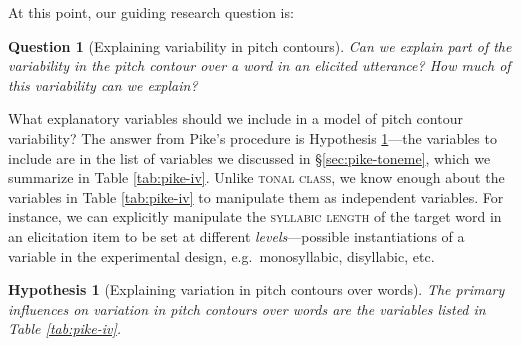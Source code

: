 \documentclass[12pt]{article}
\newtheorem{hypothesis}{Hypothesis}
\newtheorem{question}{Question}
\begin{document}
At this point, our guiding research question is:

\begin{question}[Explaining variability in pitch contours]
Can we explain part of the variability in the pitch contour over a word in an
elicited utterance? How much of this variability can we explain?
\end{question}

What explanatory variables should we include in a model of pitch
contour variability? The answer from Pike's procedure is Hypothesis
\ref{hypothesis:variance}---the variables to include are in the list of
variables we discussed in \S\ref{sec:pike-toneme}, which we summarize
in Table \ref{tab:pike-iv}. Unlike \textsc{tonal class}, we know
enough about the variables in Table \ref{tab:pike-iv} to manipulate
them as independent variables. For instance, we can explicitly
manipulate the \textsc{syllabic length} of the target word in an
elicitation item to be set at different \textit{levels}---possible
instantiations of a variable in the experimental design, e.g.\
monosyllabic, disyllabic, etc.

\begin{hypothesis}[Explaining variation in pitch contours over words]
\label{hypothesis:variance}
The primary influences on variation in pitch contours over words are
the variables listed in Table \ref{tab:pike-iv}.
\end{hypothesis}
\end{document}
